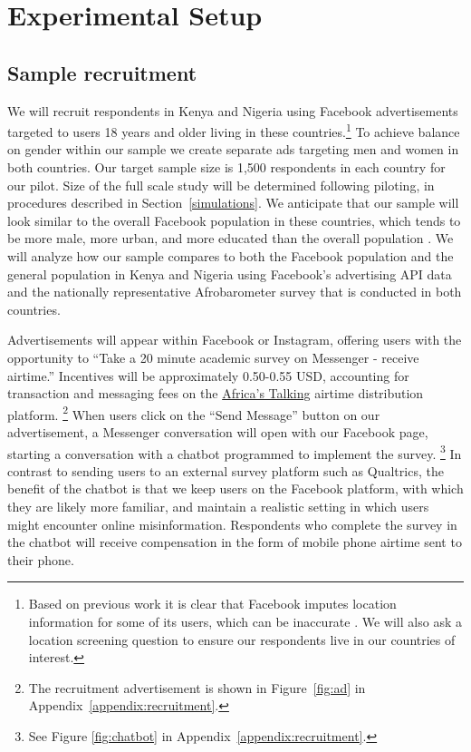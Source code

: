 \documentclass[letterpaper, 12pt, parskip=full,]{scrartcl}
\begin{document}
\FloatBarrier
\section{Experimental Setup}



\subsection{Sample recruitment}
We will recruit respondents in Kenya and Nigeria using Facebook advertisements targeted to users 18 years and older living in these countries.\footnote{Based on previous work it is clear that Facebook imputes location information for some of its users, which can be inaccurate \citep{Rosenzweig_2020}. We will also ask a location screening question to ensure our respondents live in our countries of interest.} %
To achieve balance on gender within our sample we create separate ads targeting men and women in both countries. Our target sample size is 1,500 respondents in each country for our pilot. Size of the full scale study will be determined following piloting, in procedures described in Section~\ref{simulations}. We anticipate that our sample will look similar to the overall Facebook population in these countries, which tends to be more male, more urban, and more educated than the overall population \citep{Rosenzweig_2020}. We will analyze how our sample compares to both the Facebook population and the general population in Kenya and Nigeria using Facebook's advertising API data and the nationally representative Afrobarometer survey that is conducted in both countries. 


Advertisements will appear within Facebook or Instagram, offering users with the opportunity to ``Take a 20 minute academic survey on Messenger - receive airtime.'' Incentives will be approximately 0.50-0.55 USD, accounting for transaction and messaging fees on the \href{https://africastalking.com/}{Africa's Talking} airtime distribution platform.%
\footnote{The recruitment advertisement is shown in Figure~\ref{fig:ad} in Appendix~\ref{appendix:recruitment}.} %
 When users click on the ``Send Message'' button on our advertisement, a Messenger conversation will open with our Facebook page, starting a conversation with a chatbot programmed to implement the survey.%
 \footnote{See Figure \ref{fig:chatbot} in Appendix~\ref{appendix:recruitment}.} %
 In contrast to sending users to an external survey platform such as Qualtrics, the benefit of the chatbot is that we keep users on the Facebook platform, with which they are likely more familiar, and maintain a realistic setting in which users might encounter online misinformation.  Respondents who complete the survey in the chatbot will receive compensation in the form of mobile phone airtime sent to their phone. %
\end{document}
